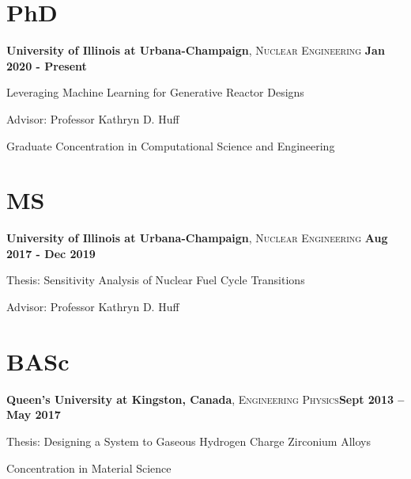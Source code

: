 \documentclass[margin,line]{resume}
\begin{document}
\begin{resume}
    \section{\mysidestyle PhD}
    \textbf{University of Illinois at Urbana-Champaign}, \textsc{Nuclear Engineering}\hfill \textbf{ Jan 2020 - Present}\vspace{-3mm}\\\vspace{-1mm}%
    \begin{list2}
        \item Leveraging Machine Learning for Generative Reactor Designs
        \item Advisor:  Professor Kathryn D. Huff
        \item Graduate Concentration in Computational Science and Engineering
    \end{list2}\vspace{-1.5mm}
    \section{\mysidestyle MS}
    \textbf{University of Illinois at Urbana-Champaign}, \textsc{Nuclear Engineering}\hfill \textbf{ Aug 2017 - Dec 2019}\vspace{-3mm}\\\vspace{-1mm}%
    \begin{list2}
        \item Thesis: Sensitivity Analysis of Nuclear Fuel Cycle Transitions
        \item Advisor:  Professor Kathryn D. Huff
    \end{list2}\vspace{-1.5mm}

    \section{\mysidestyle BASc}
    \textbf{Queen’s University at Kingston, Canada}, \textsc{Engineering Physics}\hfill\textbf{Sept 2013 -- May 2017}\vspace{-3mm}\\\vspace{-1mm}%
    \begin{list2}
        \item Thesis: Designing a System to Gaseous Hydrogen Charge Zirconium Alloys
        \item Concentration in Material Science
    \end{list2}\vspace{-1.5mm}

\end{resume}
\end{document}
